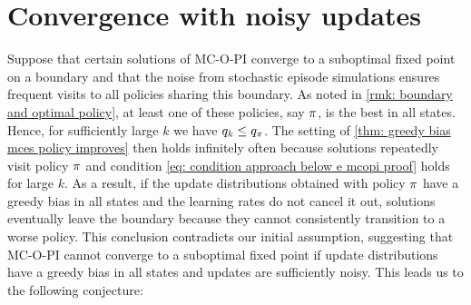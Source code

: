 
% 

% 

\vspace{-0.3cm}

\section{Convergence with noisy updates}

\vspace{-0.3cm}


Suppose that certain solutions of MC-O-PI converge to a suboptimal fixed point on a boundary and that the noise from stochastic episode simulations ensures frequent visits to all policies sharing this boundary.
As noted in \autoref{rmk: boundary and optimal policy}, at least one of these policies, say $\pi$, is the best in all states.
Hence, for sufficiently large $k$ we have $q_k \leq q_\pi$.
The setting of \autoref{thm: greedy bias mces policy improves} then holds infinitely often because solutions repeatedly visit policy $\pi$ and condition \eqref{eq: condition approach below e mcopi proof} holds for large $k$.
As a result, if the update distributions obtained with policy $\pi$ have a greedy bias in all states and the learning rates do not cancel it out,
solutions eventually leave the boundary because they cannot consistently transition to a worse policy.
This conclusion contradicts our initial assumption, suggesting that MC-O-PI cannot converge to a suboptimal fixed point if update distributions have a greedy bias in all states and updates are sufficiently noisy.
This leads us to the following conjecture:



